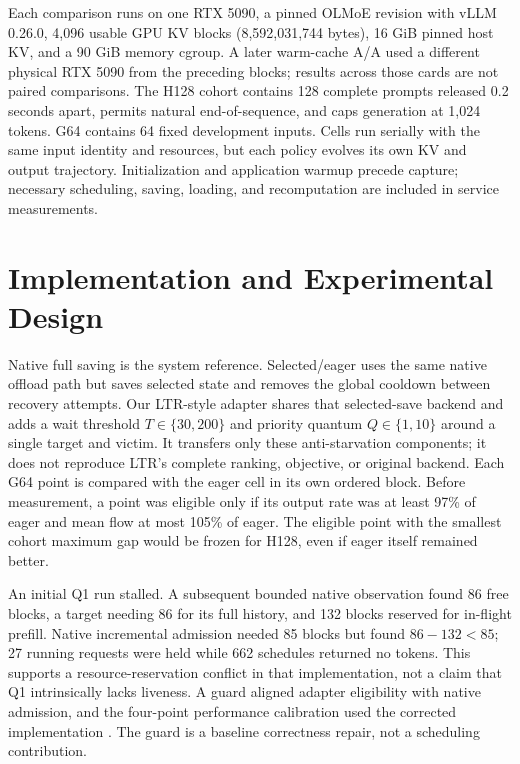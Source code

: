 \documentclass[10pt]{article}
\begin{document}
Each comparison runs on one RTX 5090, a pinned OLMoE revision with vLLM 0.26.0, 4,096 usable GPU KV blocks (8,592,031,744 bytes), 16 GiB pinned host KV, and a 90 GiB memory cgroup. A later warm-cache A/A used a different physical RTX 5090 from the preceding blocks; results across those cards are not paired comparisons. The H128 cohort contains 128 complete prompts released 0.2 seconds apart, permits natural end-of-sequence, and caps generation at 1,024 tokens. G64 contains 64 fixed development inputs. Cells run serially with the same input identity and resources, but each policy evolves its own KV and output trajectory. Initialization and application warmup precede capture; necessary scheduling, saving, loading, and recomputation are included in service measurements.

\section{Implementation and Experimental Design}
Native full saving is the system reference. Selected/eager uses the same native offload path but saves selected state and removes the global cooldown between recovery attempts. Our LTR-style adapter shares that selected-save backend and adds a wait threshold $T\in\{30,200\}$ and priority quantum $Q\in\{1,10\}$ around a single target and victim. It transfers only these anti-starvation components; it does not reproduce LTR's complete ranking, objective, or original backend. Each G64 point is compared with the eager cell in its own ordered block. Before measurement, a point was eligible only if its output rate was at least 97\% of eager and mean flow at most 105\% of eager. The eligible point with the smallest cohort maximum gap would be frozen for H128, even if eager itself remained better.

An initial Q1 run stalled. A subsequent bounded native observation found 86 free blocks, a target needing 86 for its full history, and 132 blocks reserved for in-flight prefill. Native incremental admission needed 85 blocks but found $86-132<85$; 27 running requests were held while 662 schedules returned no tokens. This supports a resource-reservation conflict in that implementation, not a claim that Q1 intrinsically lacks liveness. A guard aligned adapter eligibility with native admission, and the four-point performance calibration used the corrected implementation \cite{liveness,calibration}. The guard is a baseline correctness repair, not a scheduling contribution.
\end{document}
